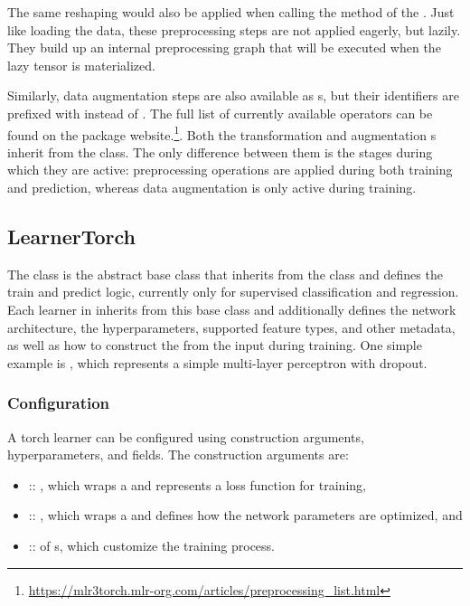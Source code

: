 \documentclass[article]{jss}
\theoremstyle{definition}
\begin{document}
The same reshaping would also be applied when calling the  method of the .
Just like loading the data, these preprocessing steps are not applied eagerly, but lazily.
They build up an internal preprocessing graph that will be executed when the lazy tensor is materialized.

Similarly, data augmentation steps are also available as s, but their identifiers are prefixed with  instead of .
The full list of currently available operators can be found on the package website.\footnote{\url{https://mlr3torch.mlr-org.com/articles/preprocessing_list.html}}.
Both the transformation and augmentation s inherit from the  class.
The only difference between them is the stages during which they are active: preprocessing operations are applied during both training and prediction, whereas data augmentation is only active during training.


\subsection{LearnerTorch}

The   class is the abstract base class that inherits from the  class and defines the train and predict logic, currently only for supervised classification and regression.
Each learner in  inherits from this base class and additionally defines the network architecture, the hyperparameters, supported feature types, and other metadata, as well as how to construct the  from the input  during training.
One simple example is , which represents a simple multi-layer perceptron with dropout.

\subsubsection{Configuration}

A torch learner can be configured using construction arguments, hyperparameters, and fields.
The construction arguments are:

\begin{itemize}
    \item {} :: , which wraps a  and represents a loss function for training,
    \item {} :: , which wraps a  and defines how the network parameters are optimized, and
    \item {} ::  of s, which customize the training process.
\end{itemize}
\end{document}

